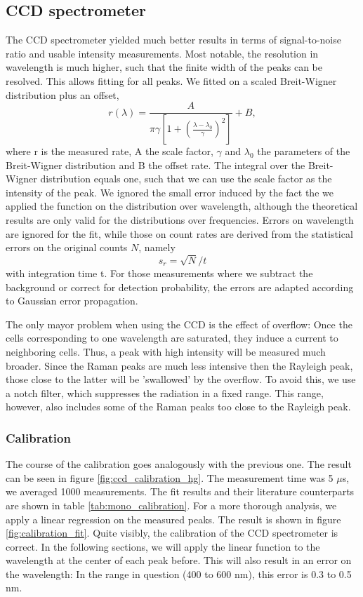 \subsection{CCD spectrometer}
The CCD spectrometer yielded much better results in terms of signal-to-noise ratio and usable intensity measurements. 
Most notable, the resolution in wavelength is much higher, such that the finite width of the peaks can be resolved.
This allows fitting for all peaks. We fitted on a scaled Breit-Wigner distribution plus an offset, 
\begin{equation}
    r(\lambda) = \frac{A}{\pi \gamma \left[1 + \left(\frac{\lambda - \lambda_0}{\gamma}\right)^2\right]} + B, 
\end{equation} 
where r is the measured rate, A the scale factor, $\gamma$ and $\lambda_0$ the parameters of the Breit-Wigner 
distribution and B the offset rate. The integral over the Breit-Wigner distribution equals one, such that we can use the 
scale factor as the intensity of the peak. 
We ignored the small error induced by the fact the we applied the function on the distribution over wavelength, although 
the theoretical results are only valid for the distributions over frequencies. Errors on wavelength are ignored 
for the fit, while those on count rates are derived from the statistical errors on the original counts $N$, namely 
\begin{equation}
    s_r = \sqrt{N} / t
\end{equation}
with integration time t. For those measurements where we subtract the background or correct for detection probability, 
the errors are adapted according to Gaussian error propagation. 

The only mayor problem when using the CCD is the effect of overflow: Once the cells corresponding to one wavelength 
are saturated, they induce a current to neighboring cells. Thus, a peak with high intensity will be measured much 
broader. Since the Raman peaks are much less intensive then the Rayleigh peak, those close to the latter will be 
'swallowed' by the overflow. To avoid this, we use a notch filter, which suppresses the radiation in a fixed range.
This range, however, also includes some of the Raman peaks too close to the Rayleigh peak. 

\subsubsection{Calibration}
The course of the calibration goes analogously with the previous one. The result can be seen in figure 
\ref{fig:ccd_calibration_hg}. The measurement time was 5 $\mu$s, we averaged 1000 measurements. 
The fit results and their literature counterparts are shown in table \ref{tab:mono_calibration}.  
For a more thorough analysis, we apply a linear regression on the measured peaks. The result is shown in 
figure \ref{fig:calibration_fit}. Quite visibly, the calibration of the CCD spectrometer is correct. 
In the following sections, we will apply the linear function to the wavelength at the center of each peak before. 
This will also result in an error on the wavelength: In the range in question (400 to 600 nm), this error is 
0.3 to 0.5 nm. 

